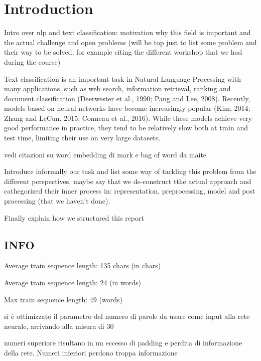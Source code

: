 \section{Introduction} \label{sec:introduction}

Intro over nlp and text classification: motivation why this field is important and the actual challenge and open problems (will be top just to list some problem and their way to be solved, for example citing the different workshop that we had during the course)


Text classification is an important task in Natural Language Processing with many applications, such as web search, information retrieval, ranking and document classification (Deerwester et al., 1990; Pang and Lee, 2008). Recently, models based on neural networks have become increasingly popular (Kim, 2014; Zhang and LeCun, 2015; Conneau et al., 2016). While these models achieve very good performance in practice, they tend to be relatively slow both at train and test time, limiting their use on very large datasets.


vedi citazioni su word embedding di mark e bag of word da maite

Introduce informally our task and list some way of tackling this problem from the different perspectives, maybe say that we de-construct tthe actual approach and cathegorized their inner process in: representation, preprocessing, model and post processing (that we haven't done).

Finally explain how we structured this report

\subsection{INFO}

Average train sequence length: 135 chars (in chars)

Average train sequence length: 24 (in words)

Max train sequence length: 49 (words)

si è ottimizzato il parametro del numero di parole da usare come input alla rete neurale, arrivando alla misura di 30

numeri superiore risultano in un eccesso di padding e perdita di informazione della rete. Numeri inferiori perdono troppa informazione

